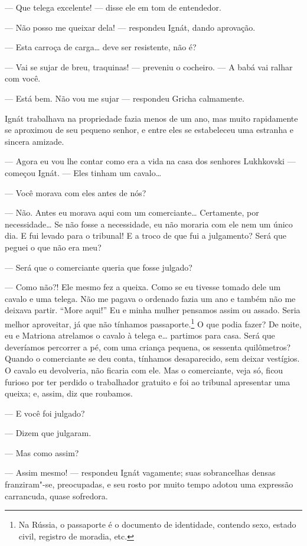 --- Que telega excelente! --- disse ele em tom de entendedor.

--- Não posso me queixar dela! --- respondeu Ignát, dando aprovação.

--- Esta carroça de carga\ldots{} deve ser resistente, não é?

--- Vai se sujar de breu, traquinas! --- preveniu o cocheiro. --- A babá
vai ralhar com você.

--- Está bem. Não vou me sujar --- respondeu Gricha calmamente.

Ignát trabalhava na propriedade fazia menos de um ano, mas muito
rapidamente se aproximou de seu pequeno senhor, e entre eles se
estabeleceu uma estranha e sincera amizade.

--- Agora eu vou lhe contar como era a vida na casa dos senhores
Lukhkovski --- começou Ignát. --- Eles tinham um cavalo\ldots{}

--- Você morava com eles antes de nós?

--- Não. Antes eu morava aqui com um comerciante\ldots{} Certamente, por
necessidade\ldots{} Se não fosse a necessidade, eu não moraria com ele nem um
único dia. E fui levado para o tribunal! E a troco de que fui a
julgamento? Será que peguei o que não era meu?

--- Será que o comerciante queria que fosse julgado?

--- Como não?! Ele mesmo fez a queixa. Como se eu tivesse tomado dele um
cavalo e uma telega. Não me pagava o ordenado fazia um ano e também não
me deixava partir. ``More aqui!'' Eu e minha mulher pensamos assim ou
assado. Seria melhor aproveitar, já que não tínhamos
passaporte.\footnote{Na Rússia, o passaporte é o documento de
  identidade, contendo sexo, estado civil, registro de moradia, etc.} O que podia fazer? De noite, eu e Matriona atrelamos o
cavalo à telega e\ldots{} partimos para casa. Será que deveríamos percorrer a
pé, com uma criança pequena, os sessenta quilômetros? Quando o
comerciante se deu conta, tínhamos desaparecido, sem deixar vestígios. O
cavalo eu devolveria, não ficaria com ele. Mas o comerciante, veja só,
ficou furioso por ter perdido o trabalhador gratuito e foi ao tribunal
apresentar uma queixa; e, assim, diz que roubamos.

--- E você foi julgado?

--- Dizem que julgaram.

--- Mas como assim?

--- Assim mesmo! --- respondeu Ignát vagamente; suas sobrancelhas densas
franziram"-se, preocupadas, e seu rosto por muito tempo adotou uma
expressão carrancuda, quase sofredora.

